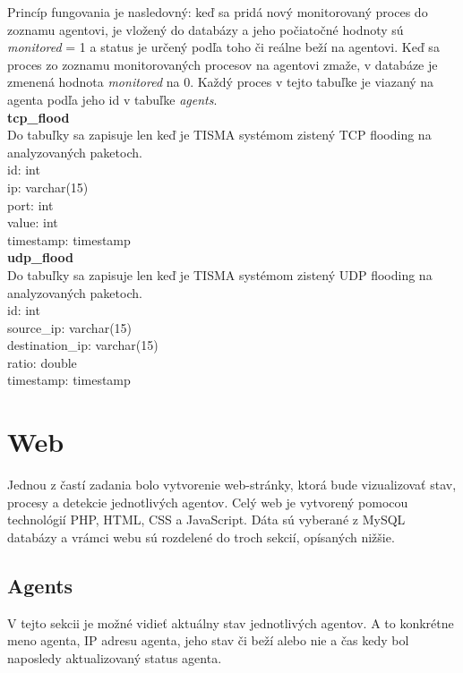 \documentclass[a4paper,12pt]{article}
\begin{document}
Princíp fungovania je nasledovný: keď sa pridá nový monitorovaný proces do zoznamu agentovi, je vložený do databázy a jeho počiatočné hodnoty sú \textit{monitored} = 1 a status je určený podľa toho či reálne beží na agentovi. Keď sa proces zo zoznamu monitorovaných procesov na agentovi zmaže, v databáze je zmenená hodnota \textit{monitored} na 0. Každý proces v tejto tabuľke je viazaný na agenta podľa jeho id v tabuľke \textit{agents}. \\

\textbf{tcp\_flood} \\

Do tabuľky sa zapisuje len keď je TISMA systémom zistený TCP flooding na analyzovaných paketoch. \\

\noindent id: int \\
ip: varchar(15) \\
port: int \\
value: int \\
timestamp: timestamp \\

\noindent \textbf{udp\_flood} \\

Do tabuľky sa zapisuje len keď je TISMA systémom zistený UDP flooding na analyzovaných paketoch. \\

\noindent id: int \\
source\_ip: varchar(15) \\
destination\_ip: varchar(15) \\
ratio: double \\
timestamp: timestamp \\
\newpage

\section{Web}
Jednou z častí zadania bolo vytvorenie web-stránky, ktorá bude vizualizovať stav, procesy a detekcie jednotlivých agentov. Celý web je vytvorený pomocou technológií PHP, HTML, CSS a JavaScript. Dáta sú vyberané z MySQL databázy a vrámci webu sú rozdelené do troch sekcií, opísaných nižšie. \\

\subsection{Agents}
V tejto sekcii je možné vidieť aktuálny stav jednotlivých agentov. A to konkrétne meno agenta, IP adresu agenta, jeho stav či beží alebo nie a čas kedy bol naposledy aktualizovaný status agenta. \\
\end{document}
